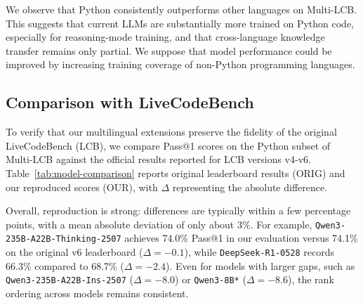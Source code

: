 \documentclass{article} %
\begin{document}
We observe that Python consistently outperforms other languages on Multi-LCB. This suggests that current LLMs are substantially more trained on Python code, especially for reasoning-mode training, and that cross-language knowledge transfer remains only partial. We suppose that model performance could be improved by increasing training coverage of non-Python programming languages.










\subsection{Comparison with LiveCodeBench}
\label{subsec_exp_comparison_lcb}



To verify that our multilingual extensions preserve the fidelity of the original LiveCodeBench (LCB), we compare Pass@1 scores on the Python subset of Multi-LCB against the official results reported for LCB versions v4-v6. 
Table~\ref{tab:model-comparison} reports original leaderboard results (ORIG) and our reproduced scores (OUR), with $\Delta$ representing the absolute difference.




Overall, reproduction is strong: differences are typically within a few percentage points, with a mean absolute deviation of only about 3\%.  
For example, \texttt{Qwen3-235B-A22B-Thinking-2507} achieves 74.0\% Pass@1 in our evaluation versus 74.1\% on the original v6 leaderboard ($\Delta=-0.1$), while \texttt{DeepSeek-R1-0528} records 66.3\% compared to 68.7\% ($\Delta=-2.4$).  
Even for models with larger gaps, such as \texttt{Qwen3-235B-A22B-Ins-2507} ($\Delta=-8.0$) or \texttt{Qwen3-8B*} ($\Delta=-8.6$), the rank ordering across models remains consistent.
\end{document}
